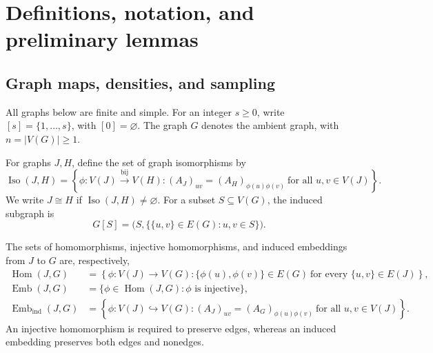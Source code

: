 \section{Definitions, notation, and preliminary lemmas}
\label{sec:definitions}

\subsection{Graph maps, densities, and sampling}
\label{subsec:graph-maps-and-sampling}

All graphs below are finite and simple.
For an integer $s\geq0$, write $[s]=\{1,\ldots,s\}$, with
$[0]=\varnothing$.
The graph $G$ denotes the ambient graph, with $n=|V(G)|\geq1$.

For graphs $J,H$, define the set of graph isomorphisms by
\begin{equation}\label{eq:graph-isomorphisms}
\operatorname{Iso}(J,H)=
\left\{\phi:V(J)\overset{\mathrm{bij}}{\longrightarrow}V(H):
(A_J)_{uv}=(A_H)_{\phi(u)\phi(v)}
\ \text{for all }u,v\in V(J)\right\}.
\end{equation}
We write $J\cong H$ if $\operatorname{Iso}(J,H)\ne\varnothing$.
For a subset $S\subseteq V(G)$, the induced subgraph is
\[
G[S]=\big(S,\{\{u,v\}\in E(G):u,v\in S\}\big).
\]

The sets of homomorphisms, injective homomorphisms, and induced embeddings
from $J$ to $G$ are, respectively,
\begin{align}
\operatorname{Hom}(J,G)
&=\left\{\phi:V(J)\longrightarrow V(G):
\{\phi(u),\phi(v)\}\in E(G)
\ \text{for every }\{u,v\}\in E(J)\right\},
\label{eq:graph-homomorphisms}\\
\operatorname{Emb}(J,G)
&=\{\phi\in\operatorname{Hom}(J,G):\phi\text{ is injective}\},
\label{eq:graph-injective-homomorphisms}\\
\operatorname{Emb}_{\mathrm{ind}}(J,G)
&=\left\{\phi:V(J)\hookrightarrow V(G):
(A_J)_{uv}=(A_G)_{\phi(u)\phi(v)}
\ \text{for all }u,v\in V(J)\right\}.
\label{eq:graph-induced-embeddings}
\end{align}
An injective homomorphism is required to preserve edges, whereas an
induced embedding preserves both edges and nonedges.

